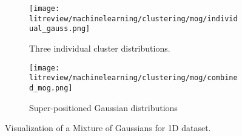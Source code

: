 \begin{figure}[htbp]
    \centering
     \begin{subfigure}[b]{0.45\textwidth}
        \texttt{[image: litreview/machinelearning/clustering/mog/individual\_gauss.png]}
	\captionsetup{format = hang}
        \caption{Three individual cluster distributions.}
        \label{fig:mog_singles}
    \end{subfigure} 
    \begin{subfigure}[b]{0.45\textwidth}
        \texttt{[image: litreview/machinelearning/clustering/mog/combined\_mog.png]}	
	\captionsetup{format = hang}
        \caption{Super-positioned Gaussian distributions}
        \label{fig:mog_combined}
    \end{subfigure}
    \captionsetup{format = hang}
    \caption{Visualization of a Mixture of Gaussians for 1D dataset.}
    \label{fig:mog_compare}
\end{figure}





